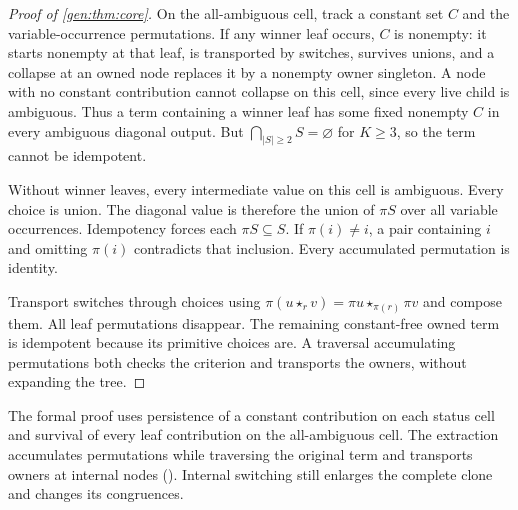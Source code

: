 \begin{proof}[Proof of \cref{gen:thm:core}]
On the all-ambiguous cell, track a constant set $C$ and the
variable-occurrence permutations. If any winner leaf occurs, $C$ is
nonempty: it starts nonempty at that leaf, is transported by switches,
survives unions, and a collapse at an owned node replaces it by a
nonempty owner singleton. A node with no constant contribution cannot
collapse on this cell, since every live child is ambiguous. Thus a term
containing a winner leaf has some fixed nonempty $C$ in every ambiguous
diagonal output. But $\bigcap_{|S|\geq2}S=\varnothing$ for $K\geq3$,
so the term cannot be idempotent.

Without winner leaves, every intermediate value on this cell is
ambiguous. Every choice is union. The diagonal value is therefore the
union of $\pi S$ over all variable occurrences. Idempotency forces each
$\pi S\subseteq S$. If $\pi(i)\ne i$, a pair containing $i$ and omitting
$\pi(i)$ contradicts that inclusion. Every accumulated permutation is
identity.

Transport switches through choices using
$\pi(u\star_r v)=\pi u\star_{\pi(r)}\pi v$ and compose them.
All leaf permutations disappear. The remaining constant-free owned term
is idempotent because its primitive choices are. A traversal accumulating
permutations both checks the criterion and transports the owners,
without expanding the tree.
\end{proof}

The formal proof uses persistence of a constant contribution on each status cell and survival of every leaf contribution on the all-ambiguous cell. The extraction accumulates permutations while traversing the original term and transports owners at internal nodes
(). Internal switching still enlarges the complete clone and changes its congruences.

